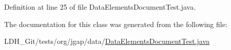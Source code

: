 Definition at line 25 of file Data\-Elements\-Document\-Test.\-java.



The documentation for this class was generated from the following file\-:\begin{DoxyCompactItemize}
\item 
L\-D\-H\-\_\-\-Git/tests/org/jgap/data/\hyperlink{_data_elements_document_test_8java}{Data\-Elements\-Document\-Test.\-java}\end{DoxyCompactItemize}
